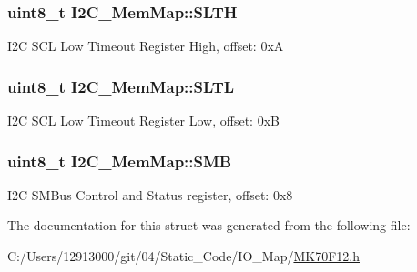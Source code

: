 \subsubsection[{S\+L\+T\+H}]{\setlength{\rightskip}{0pt plus 5cm}uint8\+\_\+t I2\+C\+\_\+\+Mem\+Map\+::\+S\+L\+T\+H}\label{struct_i2_c___mem_map_aac56d4be80ad622d7bf85bdd8c29504c}
I2\+C S\+C\+L Low Timeout Register High, offset\+: 0x\+A \hypertarget{struct_i2_c___mem_map_afd5aa3cef3245893addeb55556e1ceff}{}
\subsubsection[{S\+L\+T\+L}]{\setlength{\rightskip}{0pt plus 5cm}uint8\+\_\+t I2\+C\+\_\+\+Mem\+Map\+::\+S\+L\+T\+L}\label{struct_i2_c___mem_map_afd5aa3cef3245893addeb55556e1ceff}
I2\+C S\+C\+L Low Timeout Register Low, offset\+: 0x\+B \hypertarget{struct_i2_c___mem_map_a14ca29af4960a6588080acb71f62d5fa}{}
\subsubsection[{S\+M\+B}]{\setlength{\rightskip}{0pt plus 5cm}uint8\+\_\+t I2\+C\+\_\+\+Mem\+Map\+::\+S\+M\+B}\label{struct_i2_c___mem_map_a14ca29af4960a6588080acb71f62d5fa}
I2\+C S\+M\+Bus Control and Status register, offset\+: 0x8 

The documentation for this struct was generated from the following file\+:\begin{DoxyCompactItemize}
\item 
C\+:/\+Users/12913000/git/04/\+Static\+\_\+\+Code/\+I\+O\+\_\+\+Map/\hyperlink{_m_k70_f12_8h}{M\+K70\+F12.\+h}\end{DoxyCompactItemize}
